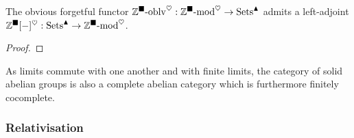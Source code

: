             \begin{proposition} \label{prop: free_solid_abelian_groups}
                The obvious forgetful functor $\mathbb{Z}^{\blacksquare}\text{-}\mathrm{oblv}^{\heartsuit}: \mathbb{Z}^{\blacksquare}\text{-}\mathrm{mod}^{\heartsuit} \to \mathrm{Sets}^{\blacktriangle}$ admits a left-adjoint $\mathbb{Z}^{\blacksquare}[-]^{\heartsuit}: \mathrm{Sets}^{\blacktriangle} \to \mathbb{Z}^{\blacksquare}\text{-}\mathrm{mod}^{\heartsuit}$. 
            \end{proposition}
                \begin{proof}
                    
                \end{proof}
            
            \begin{remark} \label{remark: the_abelian_category_of_solid_abelian_groups}
                As limits commute with one another and with finite limits, the category of solid abelian groups is also a complete abelian category which is furthermore finitely cocomplete.
            \end{remark}
        
        \subsubsection{Relativisation}